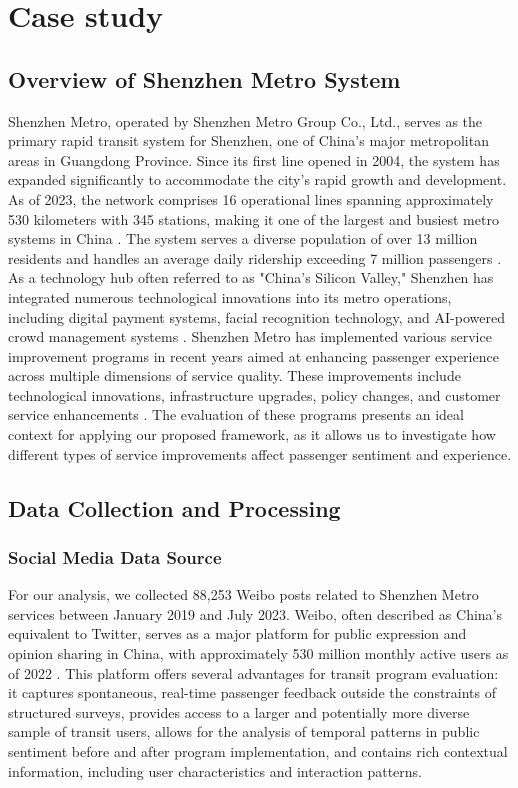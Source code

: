 \documentclass[a4paper,fleqn,12pt]{cas-sc}
\begin{document}
\section{Case study}\label{sec:CaseStudy}

\subsection{Overview of Shenzhen Metro System}

Shenzhen Metro, operated by Shenzhen Metro Group Co., Ltd., serves as the primary rapid transit system for Shenzhen, one of China's major metropolitan areas in Guangdong Province. Since its first line opened in 2004, the system has expanded significantly to accommodate the city's rapid growth and development. As of 2023, the network comprises 16 operational lines spanning approximately 530 kilometers with 345 stations, making it one of the largest and busiest metro systems in China \citep{chen2018demand}. The system serves a diverse population of over 13 million residents and handles an average daily ridership exceeding 7 million passengers \citep{li2022comparative}. As a technology hub often referred to as "China's Silicon Valley," Shenzhen has integrated numerous technological innovations into its metro operations, including digital payment systems, facial recognition technology, and AI-powered crowd management systems \citep{guo2019smart}. Shenzhen Metro has implemented various service improvement programs in recent years aimed at enhancing passenger experience across multiple dimensions of service quality. These improvements include technological innovations, infrastructure upgrades, policy changes, and customer service enhancements \citep{deng2021quality}. The evaluation of these programs presents an ideal context for applying our proposed framework, as it allows us to investigate how different types of service improvements affect passenger sentiment and experience.

\subsection{Data Collection and Processing}

\subsubsection{Social Media Data Source}

For our analysis, we collected 88,253 Weibo posts related to Shenzhen Metro services between January 2019 and July 2023. Weibo, often described as China's equivalent to Twitter, serves as a major platform for public expression and opinion sharing in China, with approximately 530 million monthly active users as of 2022 \citep{wang2022empirical}. This platform offers several advantages for transit program evaluation: it captures spontaneous, real-time passenger feedback outside the constraints of structured surveys, provides access to a larger and potentially more diverse sample of transit users, allows for the analysis of temporal patterns in public sentiment before and after program implementation, and contains rich contextual information, including user characteristics and interaction patterns.
\end{document}
